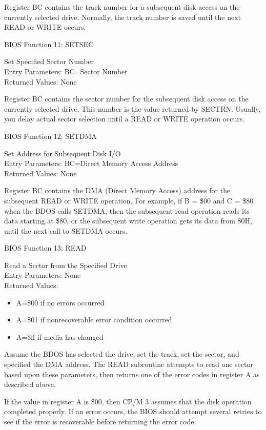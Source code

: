 Register BC contains the track number for a subsequent disk access on
the currently selected drive. Normally, the track number is saved
until the next READ or WRITE occurs.

BIOS Function 11: SETSEC

Set Specified Sector Number\\
Entry Parameters: BC=Sector Number\\
Returned Values: None

Register BC contains the sector number for the subsequent disk access
on the currently selected drive. This number is the value returned by
SECTRN. Usually, you delay actual sector selection until a READ or
WRITE operation occurs.

BIOS Function 12: SETDMA

Set Address for Subsequent Disk I/O\\
Entry Parameters: BC=Direct Memory Access Address\\
Returned Values: None

Register BC contains the DMA (Direct Memory Access) address for the
subsequent READ or WRITE operation. For example, if B = \$00 and C =
\$80 when the BDOS calls SETDMA, then the subsequent read operation
reads its data starting at \$80, or the subsequent write operation
gets its data from 80H, until the next call to SETDMA occurs.

BIOS Function 13: READ

Read a Sector from the Specified Drive\\
Entry Parameters: None\\
Returned Values:
\begin{itemize}
\item[] A=\$00 if no errors occurred
\item[] A=\$01 if nonrecoverable error condition occurred
\item[] A=\$ff if media has changed
\end{itemize}
Assume the BDOS has selected the drive, set the track, set the sector,
and specified the DMA address. The READ subroutine attempts to read
one sector based upon these parameters, then returns one of the error
codes in register A as described above.

If the value in register A is \$00, then CP/M 3 assumes that the disk
operation completed properly. If an error occurs, the BIOS should
attempt several retries to see if the error is recoverable before
returning the error code.


